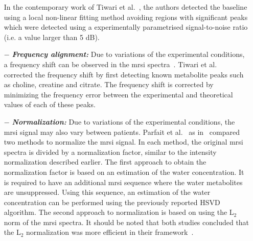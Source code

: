 \begin{enumerate}[leftmargin=*]
  In the contemporary work of Tiwari et al.~\cite{Tiwari2012}, the authors detected the baseline using a local non-linear fitting method avoiding regions with significant peaks which were detected using a experimentally parametrised signal-to-noise ratio (i.e. a value larger than 5 dB).

\item[$-$] \textbf{\textit{Frequency alignment:}} Due to variations of the experimental conditions, a frequency shift can be observed in the \ac{mrsi} spectra~\cite{Chen2002,Osorio-Garcia2012}. Tiwari et al.~\cite{Tiwari2012} corrected the frequency shift by first detecting known metabolite peaks such as choline, creatine and citrate. The frequency shift is corrected by minimizing the frequency error between the experimental and theoretical values of each of these peaks.

\item[$-$] \textbf{\textit{Normalization:}} Due to variations of the experimental conditions, the \ac{mrsi} signal may also vary between patients.
 Parfait et al.~\cite{Parfait2012} as in~\cite{Devos2004} compared two methods to normalize the \ac{mrsi} signal. In each method, the original \ac{mrsi} spectra is divided by a normalization factor, similar to the intensity normalization described earlier. The first approach to obtain the normalization factor is based on an estimation of the water concentration. It is required to have an additional \ac{mrsi} sequence where the water metabolites are unsuppressed. Using this sequence, an estimation of the water concentration can be performed using the previously reported HSVD algorithm.  The second approach to normalization is based on using the L$_2$ norm of the \ac{mrsi} spectra. It should be noted that both studies concluded that the L$_2$ normalization was more efficient in their framework~\cite{Parfait2012,Devos2004}.
  
\end{enumerate}

